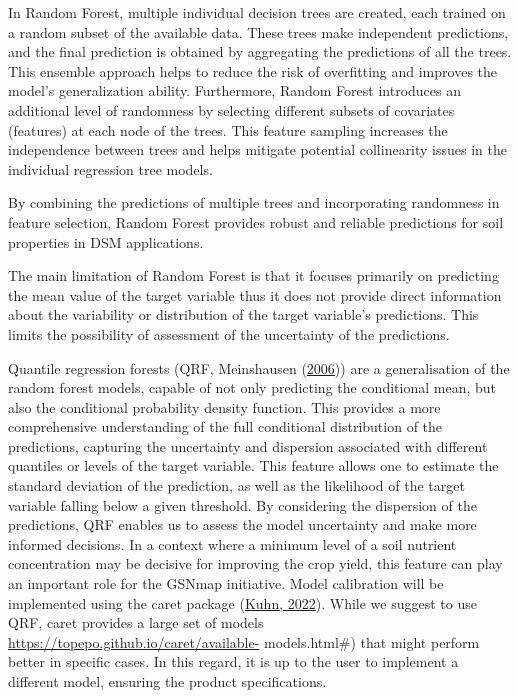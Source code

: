 \documentclass[
  10pt,
  b5paper,
  oneside]{book}
\begin{document}
In Random Forest, multiple individual decision trees are created, each trained on a random subset of the available data. These trees make independent predictions, and the final prediction is obtained by aggregating the predictions of all the trees. This ensemble approach helps to reduce the risk of overfitting and improves the model's generalization ability. Furthermore, Random Forest introduces an additional level of randomness by selecting different subsets of covariates (features) at each node of the trees. This feature sampling increases the independence between trees and helps mitigate potential collinearity issues in the individual regression tree models.

By combining the predictions of multiple trees and incorporating randomness in feature selection, Random Forest provides robust and reliable predictions for soil properties in DSM applications.

The main limitation of Random Forest is that it focuses primarily on predicting the mean value of the target variable thus it does not provide direct information about the variability or distribution of the target variable's predictions. This limits the possibility of assessment of the uncertainty of the predictions.

Quantile regression forests (QRF, Meinshausen (\protect\hyperlink{ref-Meinshausen2006}{2006})) are a generalisation of the random forest models, capable of not only predicting the conditional mean, but also the conditional probability density function. This provides a more comprehensive understanding of the full conditional distribution of the predictions, capturing the uncertainty and dispersion associated with different quantiles or levels of the target variable. This feature allows one to estimate the standard deviation of the prediction, as well as the likelihood of the target variable falling below a given threshold. By considering the dispersion of the predictions, QRF enables us to assess the model uncertainty and make more informed decisions. In a context where a minimum level of a soil nutrient concentration may be decisive for improving the crop yield, this feature can play an important role for the GSNmap initiative. Model calibration will be implemented using the caret package (\protect\hyperlink{ref-Kuhn2022}{Kuhn, 2022}). While we suggest to use QRF, caret provides a large set of models \url{https://topepo.github.io/caret/available-} models.html\#) that might perform better in specific cases. In this regard, it is up to the user to implement a different model, ensuring the product specifications.
\end{document}
